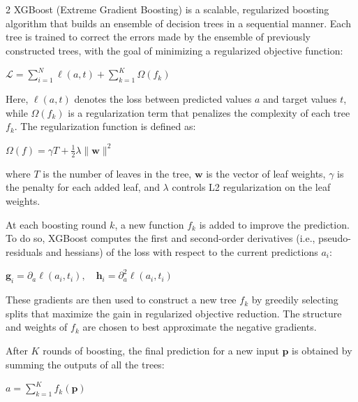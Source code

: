 \documentclass[bst/sn-nature]{sn-jnl}
\begin{document}
\begin{multicols}{2}
\quad XGBoost (Extreme Gradient Boosting) is a scalable, regularized boosting algorithm that builds an ensemble of decision trees in a sequential manner. Each tree is trained to correct the errors made by the ensemble of previously constructed trees, with the goal of minimizing a regularized objective function: \\ 

\begin{center}
    $\mathcal{L} = \sum_{i=1}^{N} \ell(a, t) + \sum_{k=1}^{K} \Omega(f_k)$ \vspace{0.3cm}
\end{center}

Here, $\ell(a, t)$ denotes the loss between predicted values $a$ and target values $t$, while $\Omega(f_k)$ is a regularization term that penalizes the complexity of each tree $f_k$. The regularization function is defined as: \\

\begin{center}
    $\Omega(f) = \gamma T + \frac{1}{2} \lambda \lVert \mathbf{w} \rVert^2$ \vspace{0.3cm}
\end{center}

where $T$ is the number of leaves in the tree, $\mathbf{w}$ is the vector of leaf weights, $\gamma$ is the penalty for each added leaf, and $\lambda$ controls L2 regularization on the leaf weights.

At each boosting round $k$, a new function $f_k$ is added to improve the prediction. To do so, XGBoost computes the first and second-order derivatives (i.e., pseudo-residuals and hessians) of the loss with respect to the current predictions $a_i$:

\begin{center}
    $\mathbf{g}_i = \partial_{a} \ell(a_i, t_i), \quad \mathbf{h}_i = \partial^2_{a} \ell(a_i, t_i)$ \vspace{0.3cm}
\end{center}

These gradients are then used to construct a new tree $f_k$ by greedily selecting splits that maximize the gain in regularized objective reduction. The structure and weights of $f_k$ are chosen to best approximate the negative gradients.

After $K$ rounds of boosting, the final prediction for a new input $\mathbf{p}$ is obtained by summing the outputs of all the trees: \\ 

\begin{center}
    $a = \sum_{k=1}^{K} f_k(\mathbf{p})$ \vspace{0.3cm}
\end{center}


\end{multicols}
\end{document}
